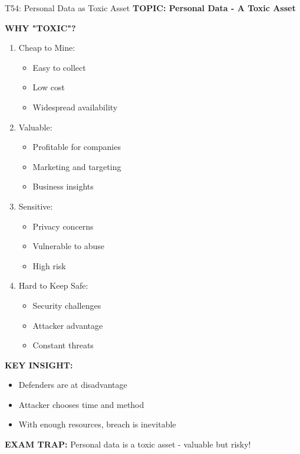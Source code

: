 \documentclass[8pt]{beamer}
\begin{document}
	\begin{frame}{T54: Personal Data as Toxic Asset}
		\fontsize{6.5}{7.5}\selectfont
		\textbf{TOPIC: Personal Data - A Toxic Asset}
		
		\vspace{0.1cm}
		\textbf{WHY "TOXIC"?}
		\begin{enumerate}
			\item \textcolor{myblue}{Cheap to Mine:}
			\begin{itemize}
				\item Easy to collect
				\item Low cost
				\item Widespread availability
			\end{itemize}
			\item \textcolor{myblue}{Valuable:}
			\begin{itemize}
				\item Profitable for companies
				\item Marketing and targeting
				\item Business insights
			\end{itemize}
			\item \textcolor{myblue}{Sensitive:}
			\begin{itemize}
				\item Privacy concerns
				\item Vulnerable to abuse
				\item High risk
			\end{itemize}
			\item \textcolor{myblue}{Hard to Keep Safe:}
			\begin{itemize}
				\item Security challenges
				\item Attacker advantage
				\item Constant threats
			\end{itemize}
		\end{enumerate}
		
		\vspace{0.1cm}
		\textbf{KEY INSIGHT:}
		\begin{itemize}
			\item Defenders are at disadvantage
			\item Attacker chooses time and method
			\item With enough resources, breach is inevitable
		\end{itemize}
		
		\textcolor{myred}{\textbf{EXAM TRAP:}} Personal data is a \textcolor{myblue}{toxic asset} - valuable but risky!
	\end{frame}
	
\end{document}
